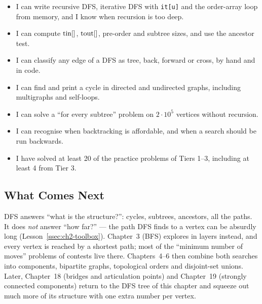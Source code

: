 \begin{checklistbox}
\begin{itemize}[leftmargin=*]
    \item[$\square$] I can write recursive DFS, iterative DFS with \texttt{it[u]} and the order-array loop from memory, and I know when recursion is too deep.
    \item[$\square$] I can compute $\mathrm{tin}[]$, $\mathrm{tout}[]$, pre-order and subtree sizes, and use the ancestor test.
    \item[$\square$] I can classify any edge of a DFS as tree, back, forward or cross, by hand and in code.
    \item[$\square$] I can find and print a cycle in directed and undirected graphs, including multigraphs and self-loops.
    \item[$\square$] I can solve a ``for every subtree'' problem on $2\cdot10^5$ vertices without recursion.
    \item[$\square$] I can recognise when backtracking is affordable, and when a search should be run backwards.
    \item[$\square$] I have solved at least 20 of the practice problems of Tiers 1--3, including at least 4 from Tier 3.
\end{itemize}
\end{checklistbox}

\subsection{What Comes Next}

DFS answers ``what is the structure?'': cycles, subtrees, ancestors, all the paths. It does \emph{not} answer ``how far?'' --- the path DFS finds to a vertex can be absurdly long (Lesson~\ref{ssec:ch2-toolbox}). Chapter~3 (BFS) explores in layers instead, and every vertex is reached by a shortest path; most of the ``minimum number of moves'' problems of contests live there. Chapters~4--6 then combine both searches into components, bipartite graphs, topological orders and disjoint-set unions. Later, Chapter~18 (bridges and articulation points) and Chapter~19 (strongly connected components) return to the DFS tree of this chapter and squeeze out much more of its structure with one extra number per vertex.
